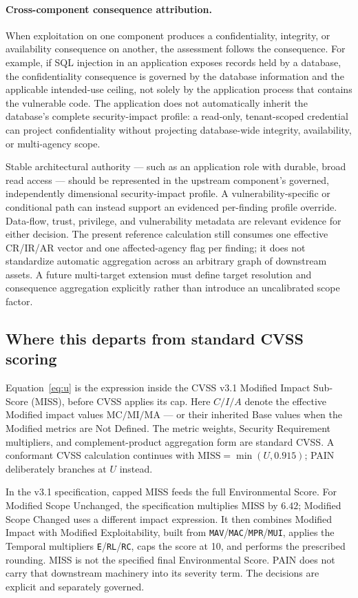 \documentclass[11pt]{article}
\newcommand{\code}[1]{\texttt{#1}}
\begin{document}
\paragraph{Cross-component consequence attribution.}
When exploitation on one component produces a confidentiality, integrity, or
availability consequence on another, the assessment follows the consequence.
For example, if SQL injection in an application exposes records held by a
database, the confidentiality consequence is governed by the database information
and the applicable intended-use ceiling, not solely by the application process
that contains the vulnerable code. The application does not automatically inherit
the database's complete security-impact profile: a read-only, tenant-scoped
credential can project confidentiality without projecting database-wide
integrity, availability, or multi-agency scope.

Stable architectural authority --- such as an application role with durable,
broad read access --- should be represented in the upstream component's governed,
independently dimensional security-impact profile. A vulnerability-specific or
conditional path can instead support an evidenced per-finding profile override.
Data-flow, trust, privilege, and vulnerability metadata are relevant evidence for
either decision. The present reference calculation still consumes one effective
CR/IR/AR vector and one affected-agency flag per finding; it does not standardize
automatic aggregation across an arbitrary graph of downstream assets. A future
multi-target extension must define target resolution and consequence aggregation
explicitly rather than introduce an uncalibrated scope factor.

\clearpage
\subsection{Where this departs from standard CVSS scoring}
\label{sec:cvss-divergence}
Equation~\eqref{eq:u} is the expression inside the CVSS v3.1 Modified Impact
Sub-Score (MISS), before CVSS applies its cap. Here $C/I/A$ denote the effective
Modified impact values $\mathrm{MC}/\mathrm{MI}/\mathrm{MA}$ --- or their inherited
Base values when the Modified metrics are Not Defined. The metric weights,
Security Requirement multipliers, and complement-product aggregation form are
standard CVSS. A conformant CVSS calculation continues with
$\mathrm{MISS}=\min(U,0.915)$; PAIN deliberately branches at $U$ instead.

In the v3.1 specification, capped MISS feeds the full Environmental Score. For Modified
Scope Unchanged, the specification multiplies MISS by $6.42$; Modified Scope
Changed uses a different impact expression. It then combines Modified Impact with
Modified Exploitability, built from \code{MAV}/\code{MAC}/\code{MPR}/\code{MUI},
applies the Temporal multipliers \code{E}/\code{RL}/\code{RC}, caps the score at
10, and performs the prescribed rounding. MISS is not the specified final
Environmental Score. PAIN does not carry that downstream machinery into its
severity term. The decisions are explicit and separately governed.
\end{document}
